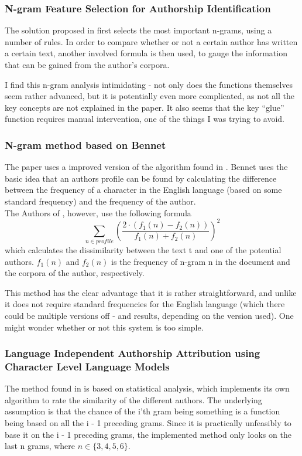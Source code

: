 \subsubsection*{N-gram Feature Selection for Authorship Identification}
The solution proposed in \cite{nr3} first selects the most important n-grams, using a number of rules. In order to compare whether or not a certain author has written a certain text, another involved formula is then used, to gauge the information that can be gained from the author's corpora.

I find this n-gram analysis intimidating - not only does the functions themselves seem rather advanced, but it is potentially even more complicated, as not all the key concepts are not explained in the paper. It also seems that the key ``glue'' function requires manual intervention, one of the things I was trying to avoid. 

\subsubsection*{N-gram method based on Bennet}
The paper \cite{nr2} uses a improved version of the algorithm found in \cite{Bennet}. Bennet uses the basic idea that an authors profile can be found by calculating the difference between the frequency of a character in the English language (based on some standard frequency) and the frequency of the author.\\

The Authors of \cite{nr2}, however, use the following formula
$$
\sum_{n \in profile}\left(\frac{2 \cdot (f_1(n) - f_2(n))}{f_1(n) + f_2(n)}\right)^2
$$
which calculates the dissimilarity between the text t and one of the potential authors. $f_1(n)$ and $f_2(n)$ is the frequency of n-gram n in the document and the corpora of the author, respectively. 

This method has the clear advantage that it is rather straightforward, and unlike \cite{Bennet} it does not require standard frequencies for the English language (which there could be multiple versions off - and results, depending on the version used). One might wonder whether or not this system is too simple.

\subsubsection*{Language Independent Authorship Attribution using Character Level Language Models}
The method found in \cite{nr4} is  based on statistical analysis, which implements its own algorithm to rate the similarity of the different authors. The underlying assumption is that the chance of the i'th gram being something is a function being based on all the i - 1 preceding grams. Since it is practically unfeasibly to base it on the i - 1 preceding grams, the implemented method only looks on the last n grams, where $n \in \{3,4,5,6 \}$. 

